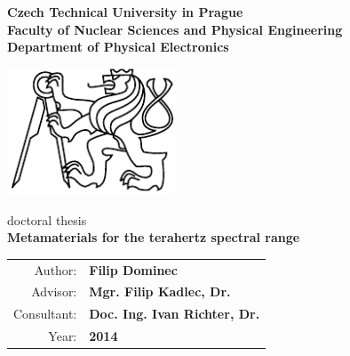 
\begin{center}
\textbf{
Czech Technical University in Prague\\
Faculty of Nuclear Sciences and Physical Engineering\\ 
Department of Physical Electronics\\
 }
 \vspace{1cm}

\includegraphics[width=5cm]{img/LogoCVUT}
\vspace{4cm}

\large{doctoral thesis}\\
\vspace{5mm}
\textbf{\huge Metamaterials for the terahertz spectral range\\}
\end{center}

\date{ } 			
 
 \vfill
 \begin{tabular}{rl}
  Author: 	&\textbf{Filip Dominec}\\
  Advisor: 	&\textbf{Mgr. Filip Kadlec, Dr.}\\
  Consultant: 	&\textbf{Doc. Ing. Ivan Richter, Dr.}\\ 
  Year:		&\textbf{2014}\\
  \end{tabular}

\thispagestyle{empty}

